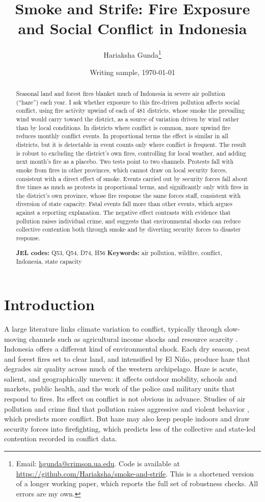 \documentclass[12pt]{article}
\title{Smoke and Strife: Fire Exposure and Social Conflict in Indonesia}
\author{Hariaksha Gunda\thanks{Email: \href{mailto:hgunda@crimson.ua.edu}{hgunda@crimson.ua.edu}. Code is available at \url{https://github.com/Hariaksha/smoke-and-strife}. This is a shortened version of a longer working paper, which reports the full set of robustness checks. All errors are my own.}}
\affil{The University of Alabama}
\date{Writing sample, \today}
\begin{document}
\maketitle

\begin{abstract}
\noindent Seasonal land and forest fires blanket much of Indonesia in severe air pollution (``haze'') each year. I ask whether exposure to this fire-driven pollution affects social conflict, using fire activity upwind of each of 481 districts, whose smoke the prevailing wind would carry toward the district, as a source of variation driven by wind rather than by local conditions. In districts where conflict is common, more upwind fire reduces monthly conflict events. In proportional terms the effect is similar in all districts, but it is detectable in event counts only where conflict is frequent. The result is robust to excluding the district's own fires, controlling for local weather, and adding next month's fire as a placebo. Two tests point to two channels. Protests fall with smoke from fires in other provinces, which cannot draw on local security forces, consistent with a direct effect of smoke. Events carried out by security forces fall about five times as much as protests in proportional terms, and significantly only with fires in the district's own province, whose fire response the same forces staff, consistent with diversion of state capacity. Fatal events fall more than other events, which argues against a reporting explanation. The negative effect contrasts with evidence that pollution raises individual crime, and suggests that environmental shocks can reduce collective contention both through smoke and by diverting security forces to disaster response.

\medskip
\noindent\textbf{JEL codes:} Q53, Q54, D74, H56 \quad \textbf{Keywords:} air pollution, wildfire, conflict, Indonesia, state capacity
\end{abstract}

\section{Introduction}

A large literature links climate variation to conflict, typically through slow-moving channels such as agricultural income shocks and resource scarcity \citep{hsiang2013quantifying, burkehsiangmiguel2015}. Indonesia offers a different kind of environmental shock. Each dry season, peat and forest fires set to clear land, and intensified by El Ni\~{n}o, produce haze that degrades air quality across much of the western archipelago. Haze is acute, salient, and geographically uneven: it affects outdoor mobility, schools and markets, public health, and the work of the police and military units that respond to fires. Its effect on conflict is not obvious in advance. Studies of air pollution and crime find that pollution raises aggressive and violent behavior \citep{herrnstadt2021, burkhardt2019}, which predicts more conflict. But haze may also keep people indoors and draw security forces into firefighting, which predicts less of the collective and state-led contention recorded in conflict data.
\end{document}
